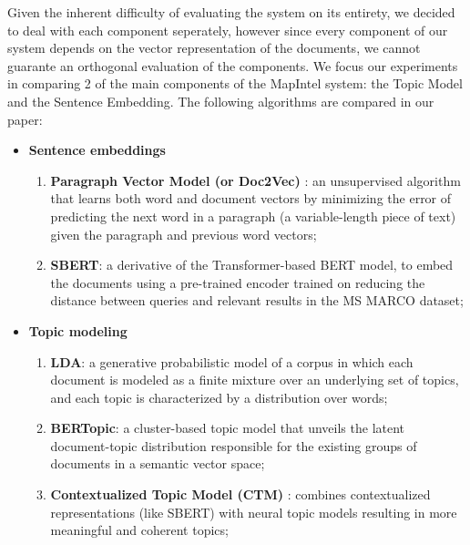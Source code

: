 \documentclass[a4paper]{article}
\begin{document}
Given the inherent difficulty of evaluating the system on its entirety, we decided to deal with each component seperately, however since every component of our system depends on the vector representation of the documents, we cannot guarante an orthogonal evaluation of the components. We focus our experiments in comparing 2 of the main components of the MapIntel system: the Topic Model and the Sentence Embedding. The following algorithms are compared in our paper:
\begin{itemize}
  \item \textbf{Sentence embeddings}
    \begin{enumerate}
      \item \textbf{Paragraph Vector Model (or Doc2Vec)} \citep{le2014}: an unsupervised algorithm that learns both word and document vectors by minimizing the error of predicting the next word in a paragraph (a variable-length piece of text) given the paragraph and previous word vectors;
      \item \textbf{SBERT}: a derivative of the Transformer-based BERT model, to embed the documents using a pre-trained encoder trained on reducing the distance between queries and relevant results in the MS MARCO dataset; 
    \end{enumerate}
  \item \textbf{Topic modeling}
    \begin{enumerate}
      \item \textbf{LDA}: a generative probabilistic model of a corpus in which each document is modeled as a finite mixture over an underlying set of topics, and each topic is characterized by a distribution over words;
      \item \textbf{BERTopic}: a cluster-based topic model that unveils the latent document-topic distribution responsible for the existing groups of documents in a semantic vector space;
      \item \textbf{Contextualized Topic Model (CTM)} \citep{bianchi2021}: combines contextualized representations (like SBERT) with neural topic models resulting in more meaningful and coherent topics;
    \end{enumerate}
\end{itemize}
\end{document}
